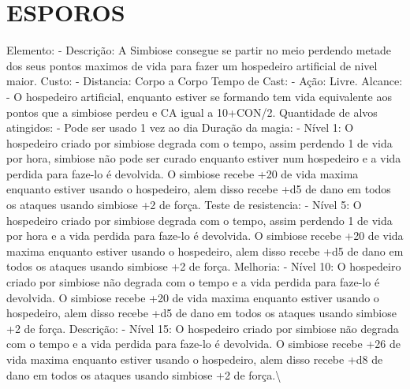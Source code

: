 \documentclass{article}%
\begin{document}
%
\section{ESPOROS}%
\label{sec:ESPOROS}%
Elemento: {-} Descrição: A Simbiose consegue se partir no meio perdendo metade dos seus pontos maximos de vida para fazer um hospedeiro artificial de nivel maior.\newline%
Custo: {-} Distancia: Corpo a Corpo\newline%
Tempo de Cast: {-} Ação: Livre.\newline%
Alcance: {-} O hospedeiro artificial, enquanto estiver se formando tem vida equivalente aos pontos que a simbiose perdeu e CA igual a 10+CON/2.\newline%
Quantidade de alvos atingidos: {-} Pode ser usado 1 vez ao dia\newline%
Duração da magia: {-} Nível 1: O hospedeiro criado por simbiose degrada com o tempo, assim perdendo 1 de vida por hora, simbiose não pode ser curado enquanto estiver num hospedeiro e a vida perdida para faze{-}lo é devolvida. O simbiose recebe +20 de vida maxima enquanto estiver usando o hospedeiro, alem disso recebe +d5 de dano em todos os ataques usando simbiose +2 de força.\newline%
Teste de resistencia: {-} Nível 5: O hospedeiro criado por simbiose degrada com o tempo, assim perdendo 1 de vida por hora e a vida perdida para faze{-}lo é devolvida. O simbiose recebe +20 de vida maxima enquanto estiver usando o hospedeiro, alem disso recebe +d5 de dano em todos os ataques usando simbiose +2 de força.\newline%
Melhoria: {-} Nível 10: O hospedeiro criado por simbiose não degrada com o tempo e a vida perdida para faze{-}lo é devolvida. O simbiose recebe +20 de vida maxima enquanto estiver usando o hospedeiro, alem disso recebe +d5 de dano em todos os ataques usando simbiose +2 de força.\newline%
Descrição: {-} Nível 15: O hospedeiro criado por simbiose não degrada com o tempo e a vida perdida para faze{-}lo é devolvida. O simbiose recebe +26 de vida maxima enquanto estiver usando o hospedeiro, alem disso recebe +d8 de dano em todos os ataques usando simbiose +2 de força.\textbackslash{}

%
\end{document}
